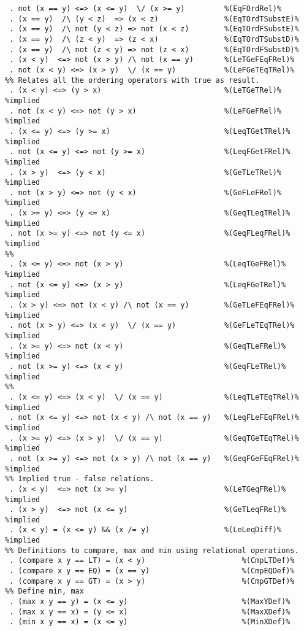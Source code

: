 \begin{Verbatim}
 . not (x == y) <=> (x <= y)  \/ (x >= y)         %(EqFOrdRel)%
 . (x == y)  /\ (y < z)  => (x < z)               %(EqTOrdTSubstE)%
 . (x == y)  /\ not (y < z) => not (x < z)        %(EqTOrdFSubstE)%
 . (x == y)  /\ (z < y)  => (z < x)               %(EqTOrdTSubstD)%
 . (x == y)  /\ not (z < y) => not (z < x)        %(EqTOrdFSubstD)%
 . (x < y)  <=> not (x > y) /\ not (x == y)       %(LeTGeFEqFRel)%
 . not (x < y) <=> (x > y)  \/ (x == y)           %(LeFGeTEqTRel)%
%% Relates all the ordering operators with true as result.
 . (x < y) <=> (y > x)                            %(LeTGeTRel)% %implied
 . not (x < y) <=> not (y > x)                    %(LeFGeFRel)% %implied
 . (x <= y) <=> (y >= x)                          %(LeqTGetTRel)% %implied
 . not (x <= y) <=> not (y >= x)                  %(LeqFGetFRel)% %implied
 . (x > y)  <=> (y < x)                           %(GeTLeTRel)% %implied
 . not (x > y) <=> not (y < x)                    %(GeFLeFRel)% %implied
 . (x >= y) <=> (y <= x)                          %(GeqTLeqTRel)% %implied
 . not (x >= y) <=> not (y <= x)                  %(GeqFLeqFRel)% %implied
%%
 . (x <= y) <=> not (x > y)                       %(LeqTGeFRel)% %implied
 . not (x <= y) <=> (x > y)                       %(LeqFGeTRel)% %implied
 . (x > y) <=> not (x < y) /\ not (x == y)        %(GeTLeFEqFRel)% %implied
 . not (x > y) <=> (x < y)  \/ (x == y)           %(GeFLeTEqTRel)% %implied
 . (x >= y) <=> not (x < y)                       %(GeqTLeFRel)% %implied
 . not (x >= y) <=> (x < y)                       %(GeqFLeTRel)% %implied
%%
 . (x <= y) <=> (x < y)  \/ (x == y)              %(LeqTLeTEqTRel)% %implied
 . not (x <= y) <=> not (x < y) /\ not (x == y)   %(LeqFLeFEqFRel)% %implied
 . (x >= y) <=> (x > y)  \/ (x == y)              %(GeqTGeTEqTRel)% %implied
 . not (x >= y) <=> not (x > y) /\ not (x == y)   %(GeqFGeFEqFRel)% %implied
%% Implied true - false relations.
 . (x < y)  <=> not (x >= y)                      %(LeTGeqFRel)% %implied
 . (x > y)  <=> not (x <= y)                      %(GeTLeqFRel)% %implied
 . (x < y) = (x <= y) && (x /= y)                 %(LeLeqDiff)% %implied
%% Definitions to compare, max and min using relational operations.
 . (compare x y == LT) = (x < y)                      %(CmpLTDef)%
 . (compare x y == EQ) = (x == y)                     %(CmpEQDef)%
 . (compare x y == GT) = (x > y)                      %(CmpGTDef)%
%% Define min, max
 . (max x y == y) = (x <= y)                          %(MaxYDef)%
 . (max x y == x) = (y <= x)                          %(MaxXDef)%
 . (min x y == x) = (x <= y)                          %(MinXDef)%

\end{Verbatim}
